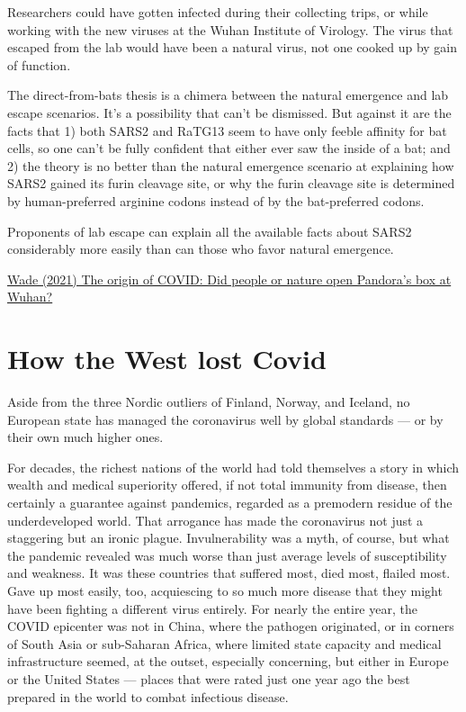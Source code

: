 \documentclass[
]{book}
\begin{document}
Researchers could have gotten infected during their collecting trips, or while working with the new viruses at the Wuhan Institute of Virology. The virus that escaped from the lab would have been a natural virus, not one cooked up by gain of function.

The direct-from-bats thesis is a chimera between the natural emergence and lab escape scenarios. It's a possibility that can't be dismissed. But against it are the facts that 1) both SARS2 and RaTG13 seem to have only feeble affinity for bat cells, so one can't be fully confident that either ever saw the inside of a bat; and 2) the theory is no better than the natural emergence scenario at explaining how SARS2 gained its furin cleavage site, or why the furin cleavage site is determined by human-preferred arginine codons instead of by the bat-preferred codons.

Proponents of lab escape can explain all the available facts about SARS2 considerably more easily than can those who favor natural emergence.

\href{https://thebulletin.org/2021/05/the-origin-of-covid-did-people-or-nature-open-pandoras-box-at-wuhan/}{Wade (2021) The origin of COVID: Did people or nature open Pandora's box at Wuhan?}

\hypertarget{how-the-west-lost-covid}{%
\section{How the West lost Covid}\label{how-the-west-lost-covid}}

Aside from the three Nordic outliers of Finland, Norway, and Iceland, no European state has managed the coronavirus well by global standards --- or by their own much higher ones.

For decades, the richest nations of the world had told themselves a story in which wealth and medical superiority offered, if not total immunity from disease, then certainly a guarantee against pandemics, regarded as a premodern residue of the underdeveloped world. That arrogance has made the coronavirus not just a staggering but an ironic plague. Invulnerability was a myth, of course, but what the pandemic revealed was much worse than just average levels of susceptibility and weakness. It was these countries that suffered most, died most, flailed most. Gave up most easily, too, acquiescing to so much more disease that they might have been fighting a different virus entirely. For nearly the entire year, the COVID epicenter was not in China, where the pathogen originated, or in corners of South Asia or sub-Saharan Africa, where limited state capacity and medical infrastructure seemed, at the outset, especially concerning, but either in Europe or the United States --- places that were rated just one year ago the best prepared in the world to combat infectious disease.
\end{document}
